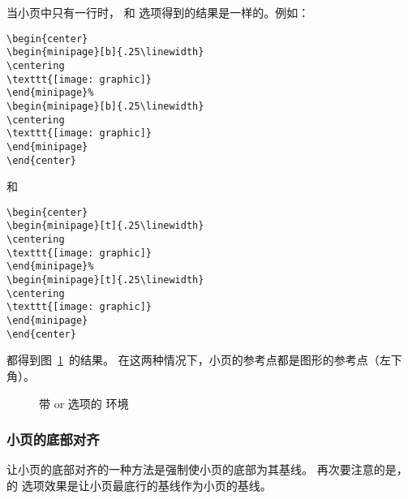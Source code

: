 当小页中只有一行时， \opt{[b]} 和 \opt{[t]} 选项得到的结果是一样的。例如：
\begin{lstlisting}
\begin{center}
\begin{minipage}[b]{.25\linewidth}
\centering
\texttt{[image: graphic]}
\end{minipage}%
\begin{minipage}[b]{.25\linewidth}
\centering
\texttt{[image: graphic]}
\end{minipage}
\end{center}
\end{lstlisting}
和
\begin{lstlisting}
\begin{center}
\begin{minipage}[t]{.25\linewidth}
\centering
\texttt{[image: graphic]}
\end{minipage}%
\begin{minipage}[t]{.25\linewidth}
\centering
\texttt{[image: graphic]}
\end{minipage}
\end{center}
\end{lstlisting}
都得到图~\ref{fig:minipagesamp-1}~的结果。
在这两种情况下，小页的参考点都是图形的参考点（左下角）。
\begin{figure}
\begin{center}
	\begin{minipage}[t]{.25\linewidth}
		\centering
		\resizebox{1in}{!}{\usebox{\boxgraphic}}
	\end{minipage}%
	\begin{minipage}[t]{.25\linewidth}
		\centering
	\end{minipage}
\end{center}
\caption{带 \opt{[b]} or \opt{[t]} 选项的  环境}
\label{fig:minipagesamp-1}
\end{figure}

\subsubsection{小页的底部对齐}
让小页的底部对齐的一种方法是强制使小页的底部为其基线。
再次要注意的是， 的 \opt{[b]} 选项效果是让小页最底行的基线作为小页的基线。

